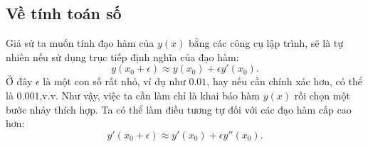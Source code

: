 \subsection{Về tính toán số}
Giả sử ta muốn tính đạo hàm của \(y(x)\) bằng các công cụ lập trình, sẽ là tự nhiên nếu sử dụng trục tiếp định nghĩa của đạo hàm:
\[y(x_0+\epsilon)\approx y(x_0)+\epsilon y'(x_0).\] Ở đây \(\epsilon\) là một con số rất nhỏ, ví dụ như \(0.01\), hay nếu cần chính xác hơn, có thể là \(0.001\),v.v. Như vậy, việc ta cần làm chỉ là khai báo hàm \(y(x)\) rồi chọn một bước nhảy thích hợp. Ta có thể làm điều tương tự đối với các đạo hàm cấp cao hơn: \[y'(x_0 +\epsilon)\approx y'(x_0)+\epsilon y''(x_0).\]
